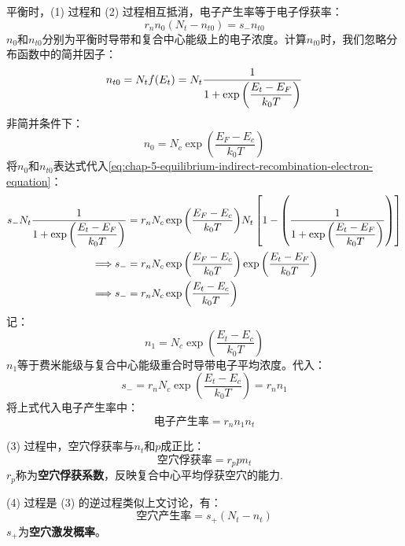平衡时，(1) 过程和 (2) 过程相互抵消，电子产生率等于电子俘获率：
\begin{equation}
    r_nn_0(N_t-n_{t0})=s_-n_{t0}\label{eq:chap-5-equilibrium-indirect-recombination-electron-equation}
\end{equation}
$n_0$和$n_{t0}$分别为平衡时导带和复合中心能级上的电子浓度。计算$n_{t0}$时，我们忽略分布函数中的简并因子：
\begin{equation}
    n_{t0}=N_tf(E_t)=N_t\frac{1}{\displaystyle 1+\exp{\left(\frac{E_t-E_F}{k_0T}\right)}}
\end{equation}
非简并条件下：
\begin{equation}
    n_0=N_c\exp{\left(\frac{E_F-E_c}{k_0T}\right)}
\end{equation}
将$n_0$和$n_{t0}$表达式代入\autoref{eq:chap-5-equilibrium-indirect-recombination-electron-equation}：
\begin{align}
    s_-N_t\frac{1}{\displaystyle 1+\exp{\left(\frac{E_t-E_F}{k_0T}\right)}}&=r_nN_c\exp{\left(\frac{E_F-E_c}{k_0T}\right)}N_t\left[1-\left(\frac{1}{\displaystyle 1+\exp{\left(\frac{E_t-E_F}{k_0T}\right)}}\right)\right]\notag\\
    \Longrightarrow s_-&=r_nN_c\exp{\left(\frac{E_F-E_c}{k_0T}\right)}\exp{\left(\frac{E_t-E_F}{k_0T}\right)}\notag\\
    \Longrightarrow s_-&=r_nN_c\exp{\left(\frac{E_t-E_c}{k_0T}\right)}
\end{align}
记：
\begin{equation}
    n_1=N_c\exp{\left(\frac{E_t-E_c}{k_0T}\right)}
\end{equation}
$n_1$等于费米能级与复合中心能级重合时导带电子平均浓度。代入：
\begin{equation}
    s_-=r_nN_c\exp{\left(\frac{E_t-E_c}{k_0T}\right)}=r_nn_1
\end{equation}
将上式代入电子产生率中：
\begin{equation}
    \text{电子产生率}=r_nn_1n_t\label{eq:chap-5-indirect-recombination-electron-generation-rate}
\end{equation}

(3) 过程中，空穴俘获率与$n_t$和$p$成正比：
\begin{equation}
    \text{空穴俘获率}=r_ppn_t\label{eq:chap-5-indirect-recombination-hole-capture-rate}
\end{equation}
$r_p$称为\textbf{空穴俘获系数}，反映复合中心平均俘获空穴的能力.

(4) 过程是 (3) 的逆过程类似上文讨论，有：
\begin{equation}
    \text{空穴产生率}=s_+(N_t-n_t)
\end{equation}
$s_+$为\textbf{空穴激发概率}。

